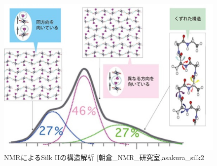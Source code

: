 \documentclass[dvipdfmx,12pt,a4paper]{jreport}
\makeatletter
\DeclareRobustCommand\cite{\unskip
    	\@ifnextchar[{\@tempswatrue\@citex}{\@tempswafalse\@citex[]}}
\makeatother
\begin{document}
		\begin{figure}[H]
			\centering
			\includegraphics[scale=0.3]{NMR_silk_II.jpg}
			\caption{NMRによるSilk IIの構造解析\cite{朝倉_NMR_研究室,asakura_silk2}}
		\end{figure}
		\newpage
\end{document}
